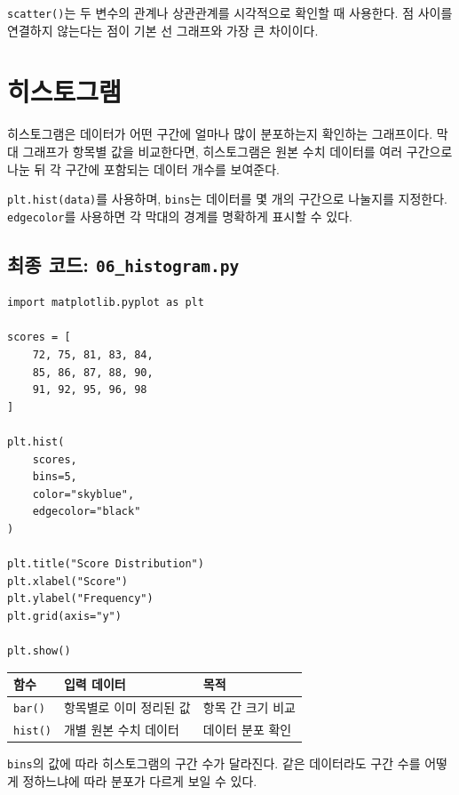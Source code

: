 \documentclass[11pt,a4paper]{article}
\begin{document}
\begin{importantbox}
\texttt{scatter()}는 두 변수의 관계나 상관관계를 시각적으로 확인할 때 사용한다. 점 사이를 연결하지 않는다는 점이 기본 선 그래프와 가장 큰 차이이다.
\end{importantbox}

\section{히스토그램}

히스토그램은 데이터가 어떤 구간에 얼마나 많이 분포하는지 확인하는 그래프이다. 막대 그래프가 항목별 값을 비교한다면, 히스토그램은 원본 수치 데이터를 여러 구간으로 나눈 뒤 각 구간에 포함되는 데이터 개수를 보여준다.

\texttt{plt.hist(data)}를 사용하며, \texttt{bins}는 데이터를 몇 개의 구간으로 나눌지를 지정한다. \texttt{edgecolor}를 사용하면 각 막대의 경계를 명확하게 표시할 수 있다.

\subsection{최종 코드: \texttt{06\_histogram.py}}

\begin{lstlisting}
import matplotlib.pyplot as plt

scores = [
    72, 75, 81, 83, 84,
    85, 86, 87, 88, 90,
    91, 92, 95, 96, 98
]

plt.hist(
    scores,
    bins=5,
    color="skyblue",
    edgecolor="black"
)

plt.title("Score Distribution")
plt.xlabel("Score")
plt.ylabel("Frequency")
plt.grid(axis="y")

plt.show()
\end{lstlisting}

\begin{center}
\begin{tabular}{lll}
\toprule
함수 & 입력 데이터 & 목적 \\
\midrule
\texttt{bar()} & 항목별로 이미 정리된 값 & 항목 간 크기 비교 \\
\texttt{hist()} & 개별 원본 수치 데이터 & 데이터 분포 확인 \\
\bottomrule
\end{tabular}
\end{center}

\begin{importantbox}
\texttt{bins}의 값에 따라 히스토그램의 구간 수가 달라진다. 같은 데이터라도 구간 수를 어떻게 정하느냐에 따라 분포가 다르게 보일 수 있다.
\end{importantbox}
\end{document}
